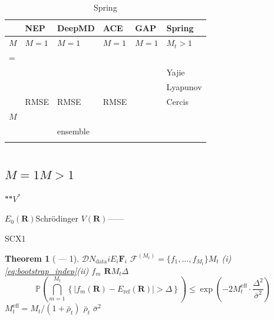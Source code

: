 \documentclass[12pt,a4paper]{article}
\newtheorem{theorem}{Theorem}[section]
\theoremstyle{remark}
\newcommand{\Pbb}{\mathbb{P}}
\newcommand{\D}{\mathcal{D}}
\newcommand{\Fset}{\mathcal{F}}
\begin{document}
\begin{table}[H]
\centering
\caption{Spring}
\label{tab:comparison_structural}
\renewcommand{\arraystretch}{1.3}
\begin{tabular}{@{}p{1.8cm} p{1.5cm} p{1.5cm} p{1.5cm} p{1.5cm} p{2.2cm}@{}}
\toprule
\textbf{} & \textbf{NEP} & \textbf{DeepMD} & \textbf{ACE} & \textbf{GAP} & \textbf{Spring} \\
\midrule
$M$ & $M=1$ & $M=1$ & $M=1$ & $M=1$ & $M_t > 1$ \\
\midrule
= &  &  &  &  & \textbf{} \\
\midrule
 &  &  &  &  & Yajie \\
\midrule
 &  &  &  &  & Lyapunov \\
\midrule
 & RMSE & RMSE & RMSE &  & Cercis \\
\midrule
$M$ &  &  &  &  &  \\
\midrule
 &  & ensemble &  &  &  \\
\midrule
 &  &  &  &  &  \\
\bottomrule
\end{tabular}
\end{table}

\newpage

\section{}

\subsection{$M=1$$M>1$}

\textbf{""$V^*$}

$E_0(\mathbf{R})$Schr\"{o}dinger
$V(\mathbf{R})$——
\textit{}



SCX1~\cite{scx_ml_audit}


\begin{theorem}[ — 1]\label{thm:spring_thm1}
$\D$$N_{\text{data}}$$i$$E_i$$\mathbf{F}_i$
$\Fset^{(M_t)} = \{f_1, \ldots, f_{M_t}\}$$M_t$
(i) \eqref{eq:bootstrap_indep}(ii) $f_m$
$\mathbf{R}$$M_t$$\Delta$
\begin{equation}\label{eq:thm1_bound}
    \Pbb\left(\bigcap_{m=1}^{M_t} \left\{|f_m(\mathbf{R}) - E_{\text{ref}}(\mathbf{R})| > \Delta\right\}\right) \leq \exp\left(-2 M_t^{\text{eff}} \cdot \frac{\Delta^2}{\bar{\sigma}^2}\right)
\end{equation}
$M_t^{\text{eff}} = M_t / (1 + \bar{\rho}_t)$
$\bar{\rho}_t$
$\bar{\sigma}^2$
\end{theorem}
\end{document}
